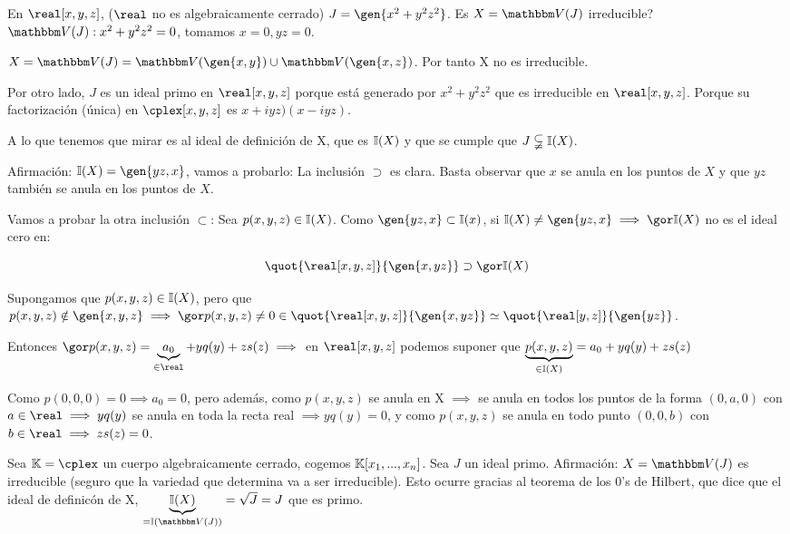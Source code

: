 \begin{example}
	En $\real[x,y,z]$, ($\real$ no es algebraicamente cerrado) $J=\gen{x^2+y^2z^2}$. Es $X=\V(J)$ irreducible? $\V(J):x^2+y^2z^2=0$, tomamos $x=0, yz=0$.
	
	$X=\V(J)=\V(\gen{x,y})\cup\V(\gen{x,z})$. Por tanto X no es irreducible.
	
	Por otro lado, $J$ es un ideal primo en $\real[x,y,z]$ porque está generado por $x^2+y^2z^2$ que es irreducible en $\real[x,y,z]$. Porque su factorización (única) en $\cplex[x,y,z]$ es $x+iyz)(x-iyz)$.
	
	A lo que tenemos que mirar es al ideal de definición de X, que es $\mathbb{I}(X)$ y que se cumple que $J \subsetneqq \mathbb{I}(X)$.
	
	Afirmación: $ \I(X)=\gen{yz,x}$, vamos a probarlo:
	La inclusión $\supset$ es clara. Basta observar que $x$ se anula en los puntos de $X$ y que $yz$ también se anula en los puntos de $X$.
	
	Vamos a probar la otra inclusión $\subset$: Sea $p(x,y,z) \in \mathbb{I}(X)$. Como $\gen{yz,x} \subset \I(x)$, si $\I(X) \neq \gen{yz,x} \implies \cls{\I(X)}$ no es el ideal cero en:
	
	$$ \quot{\real[x,y,z]}{\gen{x,yz}} \supset \cls{\I(X)} $$
	
	Supongamos que $p(x,y,z) \in \mathbb{I}(X)$, pero que $p(x,y,z) \notin \gen{x,y,z} \implies \cls{p(x,y,z)} \neq 0 \in \quot{\real[x,y,z]}{\gen{x,yz}} \simeq \quot{\real[y,z]}{\gen{yz}}$.
	
	Entonces $\cls{p(x,y,z)}=\underbrace{a_0}_{\in \real}+yq(y)+zs(z) \implies$ en $\real[x,y,z]$ podemos suponer que $\underbrace{p(x,y,z)}_{\in \mathbb{I}(X)}=a_0+yq(y)+zs(z)$
	
	Como $p(0,0,0)=0 \implies a_0=0$, pero además, como $p(x,y,z)$ se anula en X $\implies$ se anula en todos los puntos de la forma $(0,a,0)$ con $a\in \real \implies yq(y)$ se anula en toda la recta real $\implies yq(y)=0$, y como $p(x,y,z)$ se anula en todo punto $(0,0,b)$ con $b\in \real \implies zs(z)=0$.
\end{example}


\begin{example}
	Sea $\K=\cplex$ un cuerpo algebraicamente cerrado, cogemos $\mathbb{K}[x_1,...,x_n]$. Sea $J$ un ideal primo. Afirmación: $X=\V(J)$ es irreducible (seguro que la variedad que determina va a ser irreducible). Esto ocurre gracias al teorema de los 0's de Hilbert, que dice que el ideal de definicón de X, $\underbrace{\I(X)}_{=\I(\V(J))}=\sqrt{J}=J$ que es primo.
\end{example}

